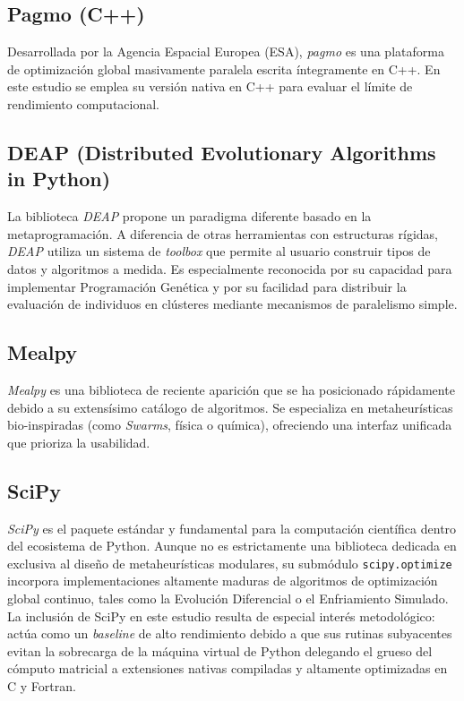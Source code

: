 \documentclass[12pt,a4paper,twoside,openright]{book}
\begin{document}
    \subsection{Pagmo (C++)}
    Desarrollada por la Agencia Espacial Europea (ESA), \textit{pagmo} \cite{pagmo} es una plataforma de optimización global masivamente paralela escrita íntegramente en C++. En este estudio se emplea su versión nativa en C++ para evaluar el límite de rendimiento computacional. 

    \subsection{DEAP (Distributed Evolutionary Algorithms in Python)}
    La biblioteca \textit{DEAP} \cite{deap} propone un paradigma diferente basado en la metaprogramación. A diferencia de otras herramientas con estructuras rígidas, \textit{DEAP} utiliza un sistema de \textit{toolbox} que permite al usuario construir tipos de datos y algoritmos a medida. Es especialmente reconocida por su capacidad para implementar Programación Genética y por su facilidad para distribuir la evaluación de individuos en clústeres mediante mecanismos de paralelismo simple.

    \subsection{Mealpy}
    \textit{Mealpy} \cite{mealpy} es una biblioteca de reciente aparición que se ha posicionado rápidamente debido a su extensísimo catálogo de algoritmos. Se especializa en metaheurísticas bio-inspiradas (como \textit{Swarms}, física o química), ofreciendo una interfaz unificada que prioriza la usabilidad.

    \subsection{SciPy}
    \textit{SciPy} \cite{scipy} es el paquete estándar y fundamental para la computación científica dentro del ecosistema de Python. Aunque no es estrictamente una biblioteca dedicada en exclusiva al diseño de metaheurísticas modulares, su submódulo \texttt{scipy.optimize} incorpora implementaciones altamente maduras de algoritmos de optimización global continuo, tales como la Evolución Diferencial o el Enfriamiento Simulado. La inclusión de SciPy en este estudio resulta de especial interés metodológico: actúa como un \textit{baseline} de alto rendimiento debido a que sus rutinas subyacentes evitan la sobrecarga de la máquina virtual de Python delegando el grueso del cómputo matricial a extensiones nativas compiladas y altamente optimizadas en C y Fortran.
\end{document}
